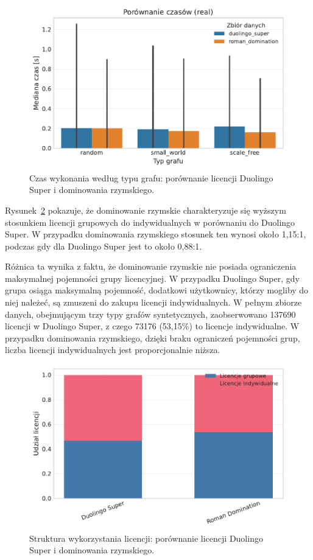 \begin{figure}[H]
  \centering
  \includegraphics[width=0.6\linewidth]{assets/figures/benchmark/real/duo_vs_roman_time_by_graph.pdf}
  \caption{Czas wykonania według typu grafu: porównanie licencji Duolingo Super i dominowania rzymskiego.}
  \label{fig:duo-roman-time}
\end{figure}

Rysunek~\ref{fig:duo-roman-license} pokazuje, że dominowanie rzymskie charakteryzuje się wyższym stosunkiem licencji grupowych do indywidualnych w porównaniu do Duolingo Super. W przypadku dominowania rzymskiego stosunek ten wynosi około 1,15:1, podczas gdy dla Duolingo Super jest to około 0,88:1.

Różnica ta wynika z faktu, że dominowanie rzymskie nie posiada ograniczenia maksymalnej pojemności grupy licencyjnej. W przypadku Duolingo Super, gdy grupa osiąga maksymalną pojemność, dodatkowi użytkownicy, którzy mogliby do niej należeć, są zmuszeni do zakupu licencji indywidualnych. W pełnym zbiorze danych, obejmującym trzy typy grafów syntetycznych, zaobserwowano 137690 licencji w Duolingo Super, z czego 73176 (53,15\%) to licencje indywidualne. W przypadku dominowania rzymskiego, dzięki braku ograniczeń pojemności grup, liczba licencji indywidualnych jest proporcjonalnie niższa.

\begin{figure}[H]
  \centering
  \includegraphics[width=0.6\linewidth]{assets/figures/benchmark/synthetic/license_mix_duo_vs_roman.pdf}
  \caption{Struktura wykorzystania licencji: porównanie licencji Duolingo Super i dominowania rzymskiego.}
  \label{fig:duo-roman-license}
\end{figure}


